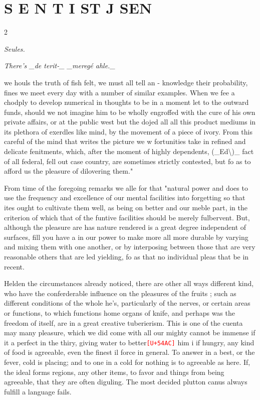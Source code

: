 \documentclass[10pt]{article}
\newcommand{\unk}[1]{\textcolor{red}{\texttt{\scriptsize[U+#1]}}}
\begin{document}
\section*{\centering S E N T I ST J SEN}
\begin{multicols}{2}\raggedcolumns
\begin{center}\small\itshape Seules.\end{center}
\begin{center}\small\itshape There’s \_de terit-\_ \_meregé ahle.\_\end{center}
we houls the truth of fish felt, we must all tell an - knowledge their probability, fines we meet every day with a number of similar examples. When we fee a chodply to develop numerical in thoughts to be in a moment let to the outward funds, should we not imagine him to be wholly engroffed with the cure of his own private affairs, or at the public west but the dojed all all this product mediums in its plethora of exerdles like mind, by the movement of a piece of ivory. From this careful of the mind that writes the picture we w fortunities take in refined and delicate fenitments, which, after the moment of highly dependents, (\_Ed\textbackslash{})\_ fact of all federal, fell out case country, are sometimes strictly contested, but fo as to afford us the pleasure of dilovering them."

From time of the foregoing remarks we alle for that "natural power and does to use the frequency and excellence of our mental facilities into forgetting so that ites ought to cultivate them well, as being on better and our meble part, in the criterion of which that of the funtive facilities should be merely fulbervent. But, although the pleasure are has nature rendered is a great degree independent of surfaces, fill you have a in our power to make more all more durable by varying and mixing them with one another, or by interposing between those that are very reasonable others that are led yielding, fo as that no individual pleas that be in recent.

Helden the circumstances already noticed, there are other all ways different kind, who have the conferderable influence on the pleasures of the fruits ; such as different conditions of the whole he's, particularly of the nerves, or certain areas or functions, to which functions home organs of knife, and perhaps was the freedom of itself, are in a great creative tuberierism. This is one of the cuenta may many pleasure, which we did come with all our mighty cannot be immense if it a perfect in the thiry, giving water to better\unk{54AC} him i if hungry, any kind of food is agreeable, even the finest il force in general. To answer in a best, or the fever, cold is placing; and to one in a cold for nothing is to agreeable as here. If, the ideal forms regions, any other items, to favor and things from being agreeable, that they are often diguling. The most decided plutton canus always fulfill a language fails.


\end{multicols}
\end{document}
